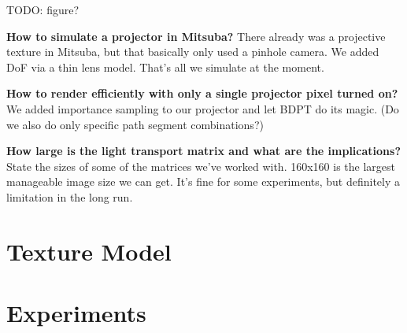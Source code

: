{\color{red} TODO: figure?}

\textbf{How to simulate a projector in Mitsuba?} {\color{red} There already was a projective texture in Mitsuba, but that basically only used a pinhole camera. We added DoF via a thin lens model. That's all we simulate at the moment.}

\textbf{How to render efficiently with only a single projector pixel turned on?} {\color{red} We added importance sampling to our projector and let BDPT do its magic. (Do we also do only specific path segment combinations?)}

\textbf{How large is the light transport matrix and what are the implications?} {\color{red} State the sizes of some of the matrices we've worked with. 160x160 is the largest manageable image size we can get. It's fine for some experiments, but definitely a limitation in the long run.}

\section{Texture Model}
\label{section:methods-texture_model}

\section{Experiments}
\label{section:method-experiments}
